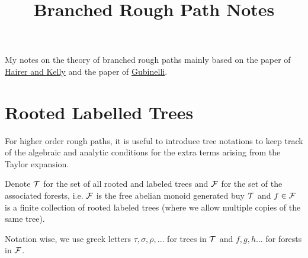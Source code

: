 \documentclass[a4paper, 10pt]{style/preprint}
\begin{document}
\title{Branched Rough Path Notes}
\author{}
\maketitle

\noindent
My notes on the theory of branched rough paths mainly based on the paper of \href{arxiv.org/abs/1210.6294}{Hairer and Kelly} 
and the paper of \href{arxiv.org/abs/math/0610300v1}{Gubinelli}.


\section{Rooted Labelled Trees}


For higher order rough paths, it is useful to introduce tree notations to keep track of the 
algebraic and analytic conditions for the extra terms arising from the Taylor expansion.

\begin{definition}
  Denote \({\mathcal T}\) for the set of all rooted and labeled trees and \({\mathcal F}\) for the set of the associated 
  forests, i.e. \({\mathcal F}\) is the free abelian monoid generated buy \({\mathcal T}\) and \(f \in {\mathcal F}\) is a finite 
  collection of rooted labeled trees (where we allow multiple copies of the same tree).

  Notation wise, we use greek letters \(\tau, \sigma, \rho, \dots\) for trees in \({\mathcal T}\) and 
  \(f, g, h \dots\) for forests in \({\mathcal F}\).
\end{definition}
\end{document}
